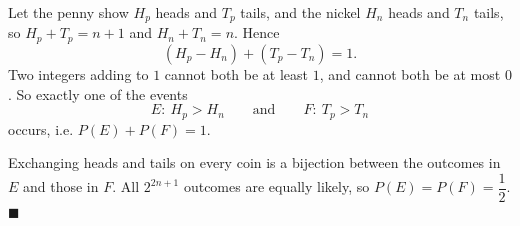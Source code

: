 Let the penny show $H_p$ heads and $T_p$ tails, and the nickel $H_n$ heads and $T_n$ tails, so $H_p+T_p=n+1$ and $H_n+T_n=n$. Hence
\[(H_p-H_n)+(T_p-T_n)=1.\]
Two integers adding to $1$ cannot both be at least $1$, and cannot both be at most $0$. So exactly one of the events
\[E:\ H_p>H_n\qquad\text{and}\qquad F:\ T_p>T_n\]
occurs, i.e. $P(E)+P(F)=1$.

Exchanging heads and tails on every coin is a bijection between the outcomes in $E$ and those in $F$. All $2^{2n+1}$ outcomes are equally likely, so $P(E)=P(F)=\dfrac12$. $\blacksquare$
